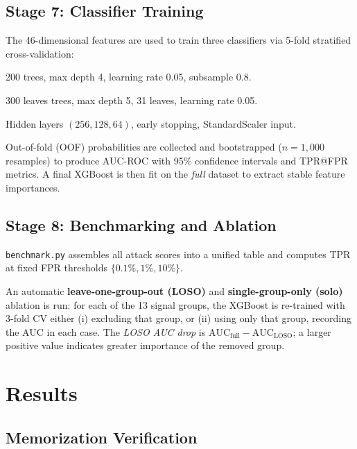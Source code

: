 \documentclass[11pt,a4paper]{article}
\begin{document}
\subsection{Stage 7: Classifier Training}
\label{sec:classifier}

The 46-dimensional features are used to train three classifiers via 5-fold
stratified cross-validation:

\begin{description}[nosep]
  \item[\textbf{XGBoost}] 200 trees, max depth 4, learning rate 0.05, subsample 0.8.
  \item[\textbf{LightGBM}] 300 leaves trees, max depth 5, 31 leaves, learning rate 0.05.
  \item[\textbf{MLP}] Hidden layers $(256, 128, 64)$, early stopping, StandardScaler input.
\end{description}

Out-of-fold (OOF) probabilities are collected and bootstrapped ($n=1{,}000$
resamples) to produce AUC-ROC with 95\% confidence intervals and TPR@FPR metrics.
A final XGBoost is then fit on the \emph{full} dataset to extract stable
feature importances.

\subsection{Stage 8: Benchmarking and Ablation}
\label{sec:benchmark}

\texttt{benchmark.py} assembles all attack scores into a unified table and
computes TPR at fixed FPR thresholds $\{0.1\%, 1\%, 10\%\}$.

An automatic \textbf{leave-one-group-out (LOSO)} and
\textbf{single-group-only (solo)} ablation is run: for each of the 13 signal
groups, the XGBoost is re-trained with 3-fold CV either (i) excluding that
group, or (ii) using only that group, recording the AUC in each case.
The \emph{LOSO AUC drop} is $\text{AUC}_{\text{full}} - \text{AUC}_{\text{LOSO}}$;
a larger positive value indicates greater importance of the removed group.

\section{Results}

\subsection{Memorization Verification}
\label{sec:results_verify}
\end{document}
